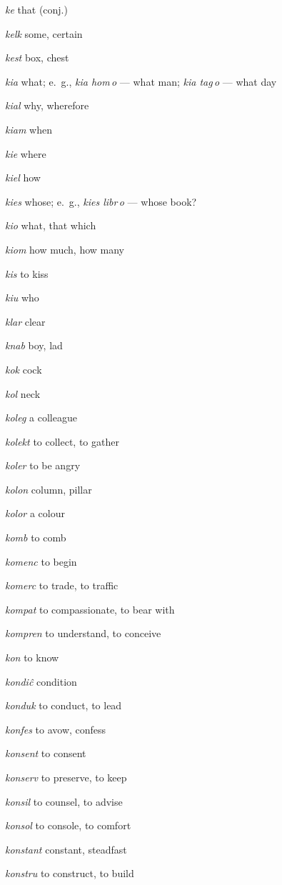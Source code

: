 \begin{landscape}
\begin{multicols}{5}
\begin{outdent}{1em}
\emph{ke } that (conj.)

\emph{kelk}  some, certain

\emph{kest}  box, chest

\emph{kia } what; e.~g., \emph{kia hom\,o} — what man; \emph{kia tag\,o} — what day

\emph{kial } why, wherefore

\emph{kiam}  when

\emph{kie } where

\emph{kiel}  how

\emph{kies}  whose; e.~g., \emph{kies libr\,o} — whose book?

\emph{kio}  what, that which

\emph{kiom}  how much, how many

\emph{kis}  to kiss

\emph{kiu}  who

\emph{klar}  clear

\emph{knab}  boy, lad

\emph{kok } cock

\emph{kol } neck

\emph{koleg}  a colleague

\emph{kolekt}  to collect, to gather

\emph{koler}  to be angry

\emph{kolon}  column, pillar

\emph{kolor}  a colour

\emph{komb } to comb

\emph{komenc}  to begin

\emph{komerc } to trade, to traffic

\emph{kompat } to compassionate, to bear with

\emph{kompren}  to understand, to conceive

\emph{kon}  to know

\emph{kondiĉ } condition

\emph{konduk } to conduct, to lead

\emph{konfes}  to avow, confess

\emph{konsent}  to consent

\emph{konserv } to preserve, to keep

\emph{konsil}  to counsel, to advise

\emph{konsol}  to console, to comfort

\emph{konstant}  constant, steadfast

\emph{konstru}  to construct, to build


\end{outdent}
\end{multicols}
\end{landscape}
